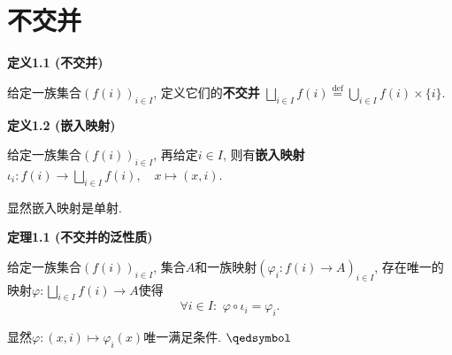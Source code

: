 \documentclass[UTF8]{ctexart}
\begin{document}
\setlength{\abovedisplayskip}{1pt}
\setlength{\belowdisplayskip}{1pt}

\section{不交并}

\hypertarget{sec:定义1.1}{}
\noindent\textbf{定义1.1 (不交并)}

给定一族集合$(f(i))_{i\in I}$, 定义它们的\textbf{不交并}
$\displaystyle
\bigsqcup_{i\in I}f(i)\overset{\mathrm{def}}{=}\bigcup_{i\in I}f(i)\times\{i\}$.

\vspace{10pt}

\hypertarget{sec:定义1.2}{}
\noindent\textbf{定义1.2 (嵌入映射)}

给定一族集合$(f(i))_{i\in I}$, 再给定$i\in I$, 则有\textbf{嵌入映射}
$\displaystyle\iota_i:f(i)\to\bigsqcup_{i\in I}f(i),\quad x\mapsto(x,i)$.

显然嵌入映射是单射.

\vspace{10pt}

\hypertarget{sec:定理1.1}{}
\noindent\textbf{定理1.1 (不交并的泛性质)}

给定一族集合$(f(i))_{i\in I}$, 集合$A$和一族映射$(\varphi_i:f(i)\to A)_{i\in I}$,
存在唯一的映射$\displaystyle\varphi:\bigsqcup_{i\in I}f(i)\to A$使得
\[
    \forall i\in I:\,\,\varphi\circ\iota_i=\varphi_i.
\]


显然$\varphi:(x,i)\mapsto\varphi_i(x)$唯一满足条件. \hfill $\qedsymbol$

\vspace{10pt}





\end{document}
